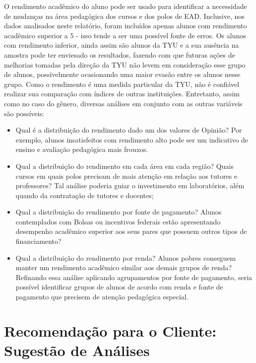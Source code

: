 \documentclass[10pt,a4paper,oneside]{article}
\begin{document}
O rendimento acadêmico do aluno pode ser usado para identificar a necessidade de mudanças na área pedagógica dos cursos e dos polos de EAD. Inclusive, nos dados analisados neste relatório, foram incluídos apenas alunos com rendimento acadêmico superior a 5 - isso tende a ser uma possível fonte de erros. Os alunos com rendimento inferior, ainda assim são alunos da TYU e a sua ausência na amostra pode ter enviesado os resultados, fazendo com que futuras ações de melhorias tomadas pela direção da TYU não levem em consideração esse grupo de alunos, possivelmente ocasionando uma maior evasão entre os alunos nesse grupo. Como o rendimento é uma medida particular da TYU, não é confiável realizar sua comparação com índices de outras instituições. Entretanto, assim como no caso do gênero, diversas análises em conjunto com as outras variáveis são possíveis:
\begin{itemize}
	\item Qual é a distribuição do rendimento dado um dos valores de Opinião? Por exemplo, alunos insatisfeitos com rendimento alto pode ser um indicativo de ensino e avaliação pedagógica mais frouxos.
	\item Qual a distribuição do rendimento em cada área em cada região? Quais cursos em quais polos precisam de mais atenção em relação aos tutores e professores? Tal análise poderia guiar o investimento em laboratórios, além quando da contratação de tutores e docentes;
	\item Qual a distribuição do rendimento por fonte de pagamento? Alunos contemplados com Bolsas ou incentivos federais estão apresentando desempenho acadêmico superior aos seus pares que possuem outros tipos de financiamento? 
	\item Qual a distribuição do rendimento por renda? Alunos pobres conseguem manter um rendimento acadêmico similar aos demais grupos de renda? Refinando essa análise aplicando agrupamentos por fonte de pagamento, seria possível identificar grupos de alunos de acordo com renda e fonte de pagamento que precisem de atenção pedagógica especial.
\end{itemize}


% 
% 

\FloatBarrier
\section{Recomendação para o Cliente: Sugestão de Análises}
\label{section:sugestao}
\end{document}
